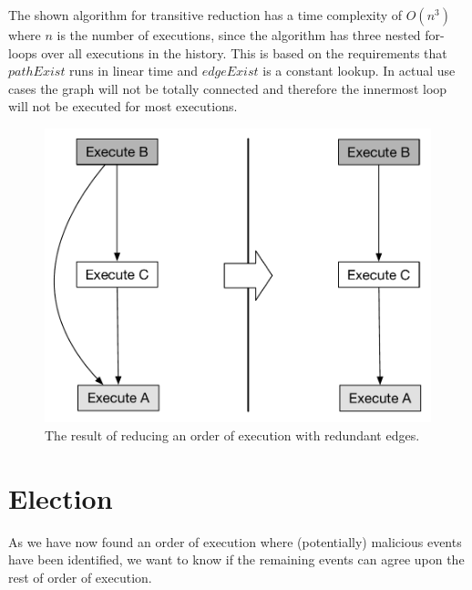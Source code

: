 	\newpar The shown algorithm for transitive reduction has a time complexity of $O(n^3)$ where $n$ is the number of executions, since the algorithm has three nested for-loops over all executions in the history. This is based on the requirements that $pathExist$ runs in linear time and $edgeExist$ is a constant lookup. In actual use cases the graph will not be totally connected and therefore the innermost loop will not be executed for most executions. 
	
	\begin{figure}[H]
		\centering
		\includegraphics[height=0.35\textheight]{6orderofexecution/images/reduce-before-after.pdf}
		\caption{The result of reducing an order of execution with redundant edges.}
		\label{fig:orderofexecution:reduce-before-after}
	\end{figure}



	\section{Election} 
	As we have now found an order of execution where (potentially) malicious events have been identified, we want to know if the remaining events can agree upon the rest of order of execution.
	
